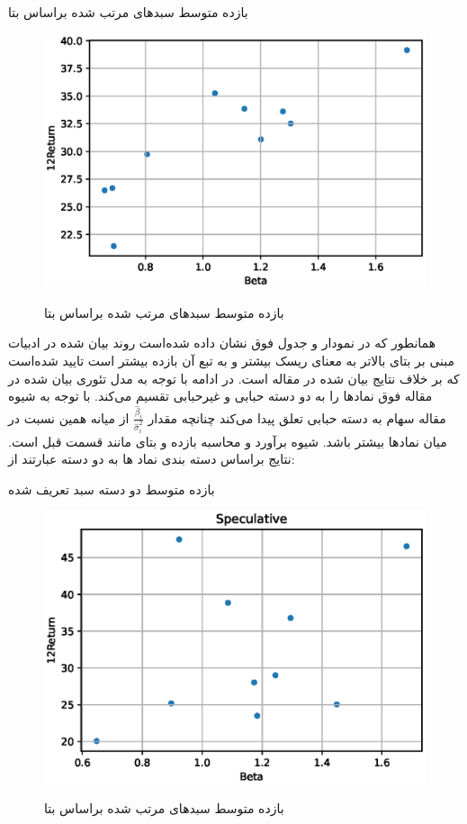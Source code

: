 \documentclass[12pt, a4paper]{article}
\begin{document}
		\begin{table}[htbp]
	\centering
	\caption{بازده متوسط سبد‌های مرتب شده براساس بتا}
\begin{LTR}	\resizebox{0.9\textwidth}{!}{
		
		\label{tab:table1}	
	}
\end{LTR}
\end{table}
	\begin{figure}[htbp]
	\centering
	\caption{بازده متوسط سبد‌های مرتب شده براساس بتا}
	\includegraphics[width=0.7\linewidth]{BetaReturn10.eps}
	\label{fig:BetaReturn10}
\end{figure}
 همانطور که در نمودار و جدول فوق نشان داده شده‌است روند بیان شده در ادبیات مبنی بر بتای بالاتر به معنای ریسک بیشتر و به تبع آن بازده بیشتر است تایید شده‌است که بر خلاف نتایج بیان شده در مقاله 
 \cite{hong2016speculative}
 است. 
 در ادامه با توجه به مدل تئوری بیان شده در مقاله فوق نماد‌ها را به دو دسته حبابی و غیرحبابی تقسیم می‌کند. با توجه به شیوه مقاله سهام به دسته حبابی تعلق پیدا می‌کند چنانچه مقدار 
 $ \frac{\hat{\beta}_i}{\hat{\sigma}^2_i} $
 از میانه همین نسبت در میان نماد‌ها بیشتر باشد. شیوه برآورد و محاسبه بازده و بتای مانند قسمت قبل است. نتایج براساس دسته بندی نماد ها به دو دسته عبارتند از:
 \begin{table}[htbp]
 	\centering
 	\caption{بازده متوسط دو دسته سبد تعریف شده }
 	\begin{LTR}
 	\resizebox{0.7\textwidth}{!}{
 		
 		\label{tab:table2}	
 	}
 	\end{LTR}
 \end{table}


\begin{figure}[htbp]
\centering
\caption{بازده متوسط سبد‌های مرتب شده براساس بتا}
\includegraphics[width=0.7\linewidth]{SpeculativeBetaReturn10.eps}
\label{fig:SpeculativeBetaReturn10}
\end{figure}
\end{document}
